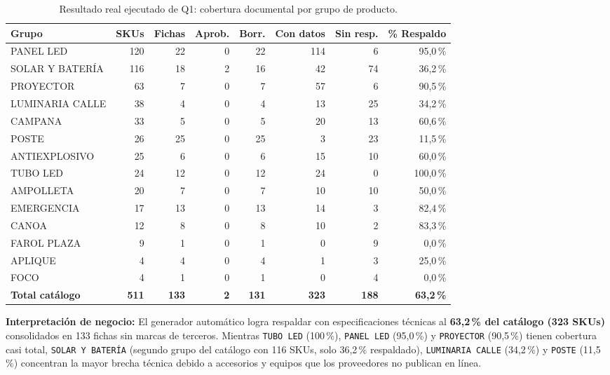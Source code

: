 \documentclass{article}
\begin{document}
\begin{table}[H]
\centering
\scriptsize
\begin{tabularx}{\textwidth}{Lrrrrrrr}
\toprule
\textbf{Grupo} & \textbf{SKUs} & \textbf{Fichas} & \textbf{Aprob.} & \textbf{Borr.} & \textbf{Con datos} & \textbf{Sin resp.} & \textbf{\% Respaldo} \\
\midrule
PANEL LED & 120 & 22 & 0 & 22 & 114 & 6 & 95,0\,\% \\
SOLAR Y BATERÍA & 116 & 18 & 2 & 16 & 42 & 74 & 36,2\,\% \\
PROYECTOR & 63 & 7 & 0 & 7 & 57 & 6 & 90,5\,\% \\
LUMINARIA CALLE & 38 & 4 & 0 & 4 & 13 & 25 & 34,2\,\% \\
CAMPANA & 33 & 5 & 0 & 5 & 20 & 13 & 60,6\,\% \\
POSTE & 26 & 25 & 0 & 25 & 3 & 23 & 11,5\,\% \\
ANTIEXPLOSIVO & 25 & 6 & 0 & 6 & 15 & 10 & 60,0\,\% \\
TUBO LED & 24 & 12 & 0 & 12 & 24 & 0 & 100,0\,\% \\
AMPOLLETA & 20 & 7 & 0 & 7 & 10 & 10 & 50,0\,\% \\
EMERGENCIA & 17 & 13 & 0 & 13 & 14 & 3 & 82,4\,\% \\
CANOA & 12 & 8 & 0 & 8 & 10 & 2 & 83,3\,\% \\
FAROL PLAZA & 9 & 1 & 0 & 1 & 0 & 9 & 0,0\,\% \\
APLIQUE & 4 & 4 & 0 & 4 & 1 & 3 & 25,0\,\% \\
FOCO & 4 & 1 & 0 & 1 & 0 & 4 & 0,0\,\% \\
\midrule
\textbf{Total catálogo} & \textbf{511} & \textbf{133} & \textbf{2} & \textbf{131} & \textbf{323} & \textbf{188} & \textbf{63,2\,\%} \\
\bottomrule
\end{tabularx}
\caption{Resultado real ejecutado de Q1: cobertura documental por grupo de producto.}
\end{table}

\textbf{Interpretación de negocio:} El generador automático logra respaldar con especificaciones técnicas al \textbf{63,2\,\% del catálogo (323 SKUs)} consolidados en 133 fichas sin marcas de terceros. Mientras \texttt{TUBO LED} (100\,\%), \texttt{PANEL LED} (95,0\,\%) y \texttt{PROYECTOR} (90,5\,\%) tienen cobertura casi total, \texttt{SOLAR Y BATERÍA} (segundo grupo del catálogo con 116 SKUs, solo 36,2\,\% respaldado), \texttt{LUMINARIA CALLE} (34,2\,\%) y \texttt{POSTE} (11,5\,\%) concentran la mayor brecha técnica debido a accesorios y equipos que los proveedores no publican en línea.
\end{document}

